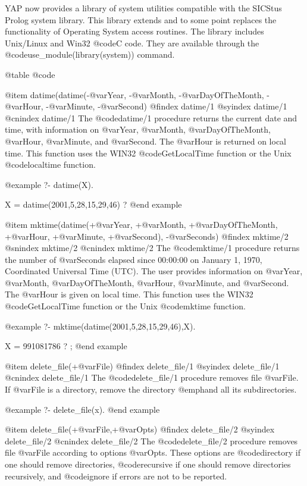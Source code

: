 YAP now provides a library of system utilities compatible with the
SICStus Prolog system library. This library extends and to some point
replaces the functionality of Operating System access routines. The
library includes Unix/Linux and Win32 @code{C} code. They
are available through the @code{use_module(library(system))} command.

@table @code

@item datime(datime(-@var{Year}, -@var{Month}, -@var{DayOfTheMonth},
-@var{Hour}, -@var{Minute}, -@var{Second})
@findex  datime/1
@syindex datime/1
@cnindex datime/1
The @code{datime/1} procedure returns the current date and time, with
information on @var{Year}, @var{Month}, @var{DayOfTheMonth},
@var{Hour}, @var{Minute}, and @var{Second}. The @var{Hour} is returned
on local time. This function uses the WIN32
@code{GetLocalTime} function or the Unix @code{localtime} function.

@example
   ?- datime(X).

X = datime(2001,5,28,15,29,46) ? 
@end example

@item mktime(datime(+@var{Year}, +@var{Month}, +@var{DayOfTheMonth},
+@var{Hour}, +@var{Minute}, +@var{Second}), -@var{Seconds})
@findex  mktime/2
@snindex mktime/2
@cnindex mktime/2
The @code{mktime/1} procedure returns the number of @var{Seconds}
elapsed since 00:00:00 on January 1, 1970, Coordinated Universal Time
(UTC).  The user provides information on @var{Year}, @var{Month},
@var{DayOfTheMonth}, @var{Hour}, @var{Minute}, and @var{Second}. The
@var{Hour} is given on local time. This function uses the WIN32
@code{GetLocalTime} function or the Unix @code{mktime} function.

@example
   ?- mktime(datime(2001,5,28,15,29,46),X).

X = 991081786 ? ;
@end example

@item delete_file(+@var{File})
@findex  delete_file/1
@syindex delete_file/1
@cnindex delete_file/1
The @code{delete_file/1} procedure removes file @var{File}. If
@var{File} is a directory, remove the directory @emph{and all its subdirectories}.

@example
   ?- delete_file(x).
@end example

@item delete_file(+@var{File},+@var{Opts})
@findex  delete_file/2
@syindex delete_file/2
@cnindex delete_file/2
The @code{delete_file/2} procedure removes file @var{File} according to
options @var{Opts}. These options are @code{directory} if one should
remove directories, @code{recursive} if one should remove directories
recursively, and @code{ignore} if errors are not to be reported.

